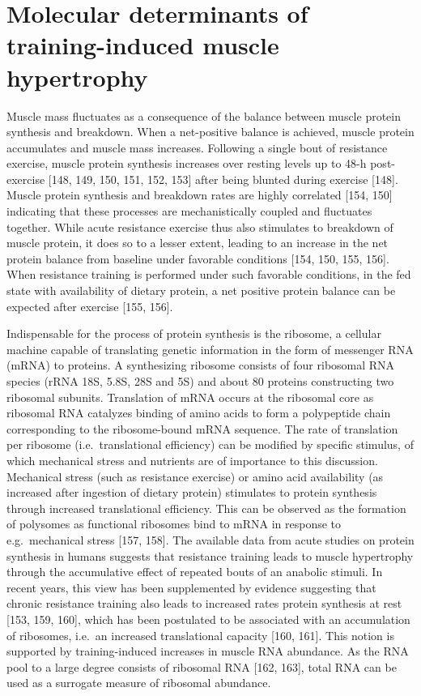\documentclass[twoside,10pt]{gihclass} %
\begin{document}
\hypertarget{molecular-determinants-of-training-induced-muscle-hypertrophy}{%
\section{Molecular determinants of training-induced muscle hypertrophy}\label{molecular-determinants-of-training-induced-muscle-hypertrophy}}

Muscle mass fluctuates as a consequence of the balance between muscle protein synthesis and breakdown. When a net-positive balance is achieved, muscle protein accumulates and muscle mass increases.
Following a single bout of resistance exercise, muscle protein synthesis increases
over resting levels up to 48-h post-exercise
{[}148, 149, 150, 151, 152, 153{]}
after being blunted during exercise
{[}148{]}.
Muscle protein synthesis and breakdown rates are highly correlated
{[}154, 150{]}
indicating that these processes are mechanistically coupled and fluctuates together.
While acute resistance exercise thus also stimulates to breakdown of muscle protein, it does so to a lesser extent, leading to an increase in the net protein balance from baseline under favorable conditions
{[}154, 150, 155, 156{]}.
When resistance training is performed under such favorable conditions, in the fed state with availability of dietary protein, a net positive protein balance can be expected after exercise
{[}155, 156{]}.

Indispensable for the process of protein synthesis is the ribosome, a cellular machine capable of translating genetic information in the form of messenger RNA (mRNA) to proteins.
A synthesizing ribosome consists of four ribosomal RNA species (rRNA 18S, 5.8S, 28S and 5S) and about 80 proteins constructing two ribosomal subunits. Translation of mRNA occurs at the ribosomal core as ribosomal RNA catalyzes binding of amino acids to form a polypeptide chain corresponding to the ribosome-bound mRNA sequence.
The rate of translation per ribosome (i.e.~translational efficiency) can be modified by specific stimulus, of which mechanical stress and nutrients are of importance to this discussion.
Mechanical stress (such as resistance exercise) or amino acid availability (as increased after ingestion of dietary protein) stimulates to protein synthesis through increased translational efficiency.
This can be observed as the formation of polysomes as functional ribosomes bind to mRNA in response to e.g.~mechanical stress
{[}157, 158{]}.
The available data from acute studies on protein synthesis in humans suggests that resistance training leads to muscle hypertrophy through the accumulative effect of repeated bouts of an anabolic stimuli. In recent years, this view has been supplemented by evidence suggesting that chronic resistance training also leads to increased rates protein synthesis at rest
{[}153, 159, 160{]},
which has been postulated to be associated with an accumulation of ribosomes, i.e.~an increased translational capacity
{[}160, 161{]}.
This notion is supported by training-induced increases in muscle RNA abundance.
As the RNA pool to a large degree consists of ribosomal RNA
{[}162, 163{]},
total RNA can be used as a surrogate measure of ribosomal abundance.
\end{document}
